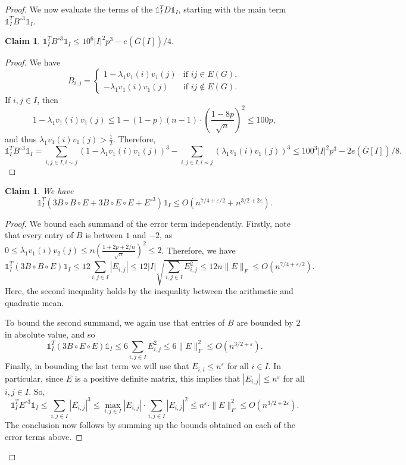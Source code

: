 \documentclass[11pt]{article}
\theoremstyle{plain}
\newtheorem{claim}[theorem]{Claim}
\theoremstyle{definition}
\newcommand{\eps}{\varepsilon}
\begin{document}
\begin{proof}
We now evaluate the terms of the $\mathds{1}_I^T D \mathds{1}_I$, starting with the main term $\mathds{1}_I^T B^{\circ 3} \mathds{1}_I$. 
\begin{claim} \label{claim:main term}
$\mathds{1}^T_I B^{\circ 3}\mathds{1}_I\leq 10^6|I|^2p^3-e(\overline{G}[I])/4$.
\end{claim}
\begin{proof}
We have 
$$B_{i,j}=\begin{cases}
    1-\lambda_1v_1(i)v_1(j) &\mbox{if }ij\in E(G),\\
    -\lambda_1v_1(i)v_1(j) &\mbox{if }ij\notin E(G).
\end{cases}$$
If $i,j\in I$, then
$$1-\lambda_1v_1(i)v_1(j)\leq 1-(1-p)(n-1)\cdot \left(\frac{1-8p}{\sqrt{n}}\right)^2\leq 100p,$$
and  thus $\lambda_1v_1(i)v_1(j)>\frac{1}{2}$. Therefore,
$$\mathds{1}^T_I B^{\circ 3}\mathds{1}_I=\sum_{i,j\in I, i\sim j} (1-\lambda_1v_1(i)v_1(j))^3-\sum_{i,j\in I, i\not\sim j}(\lambda_1v_1(i)v_1(j))^3\leq 100^3|I|^2p^3-2e(\overline{G}[I])/8.$$
\end{proof}

\begin{claim} \label{claim:error term}
We have
\[\mathds{1}^T_I (3B\circ B\circ E+3B\circ E\circ E+E^{\circ 3})\mathds{1}_I\leq O(n^{7/4+\eps/2}+n^{3/2+2\eps}).\]
\end{claim}
\begin{proof}
We bound each summand of the error term independently. Firstly, note that every entry of $B$ is between $1$ and $-2$, as $0\leq \lambda_1v_1(i)v_2(j)\leq n\left(\frac{1+2p+2/n}{\sqrt{n}}\right)^2\leq 2$. Therefore, we have 
$$\mathds{1}^T_I (3B\circ B\circ E)\mathds{1}_I\leq 12\sum_{i,j\in I} |E_{i,j}|\leq 12|I|\sqrt{\sum_{i,j\in I}E_{i,j}^2}\leq 12n\|E\|_F\leq O(n^{7/4+\eps/2}).$$
Here, the second inequality holds by the inequality between the arithmetic and quadratic mean.

To bound the second summand, we again use that entries of $B$ are bounded by $2$ in absolute value, and so
$$\mathds{1}^T_I (3B\circ E\circ E)\mathds{1}_I\leq 6\sum_{i,j\in I} E_{i,j}^2\leq 6\|E\|_F^2\leq O(n^{3/2+\eps}).$$
Finally, in bounding the last term we will use that $E_{i, i}\leq n^\eps$ for all $i\in I$. In particular, since $E$ is a positive definite matrix, this implies that $|E_{i, j}|\leq n^{\eps}$ for all $i, j\in I$. So,
$$\mathds{1}^T_I E^{\circ 3}\mathds{1}_I\leq \sum_{i,j\in I} |E_{i,j}|^3\leq \max_{i,j\in I} |E_{i,j}|\cdot \sum_{i,j\in I}|E_{i,j}|^2\leq n^\eps \cdot \|E\|_F^2\leq O(n^{3/2+2\eps}).$$
The conclusion now follows by summing up the bounds obtained on each of the error terms above.
\end{proof}


\end{proof}
\end{document}
